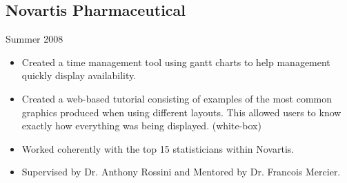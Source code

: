 \documentclass[oneside]{article}
\begin{document}
% 
% 



\subsection{Novartis Pharmaceutical} Summer 2008
\begin{itemize}
  \item Created a time management tool using gantt charts to help management quickly display availability.
  \item Created a web-based tutorial consisting of examples of the most common graphics produced when using different layouts.  This allowed users to know exactly how everything was being displayed.  (white-box)
  \item Worked coherently with the top 15 statisticians within Novartis.
  \item Supervised by Dr. Anthony Rossini and Mentored by Dr. Francois Mercier.
\end{itemize}

% 
% 
\end{document}
